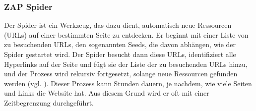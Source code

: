 \subsubsection{ZAP Spider}

Der Spider ist ein Werkzeug, das dazu dient, automatisch neue
Ressourcen (URLs) auf einer bestimmten Seite zu entdecken.
Er beginnt mit einer Liste von zu besuchenden URLs, den
sogenannten Seeds, die davon abhängen, wie der Spider gestartet
wird. Der Spider besucht dann diese URLs, identifiziert alle
Hyperlinks auf der Seite und fügt sie der Liste der zu besuchenden
URLs hinzu, und der Prozess wird rekursiv fortgesetzt, solange neue
Ressourcen gefunden werden (vgl. \cite{spider}). Dieser Prozess kann
Stunden dauern, je nachdem, wie viele Seiten und Links die Website
hat. Aus diesem Grund wird er oft mit einer Zeitbegrenzung durchgeführt.
